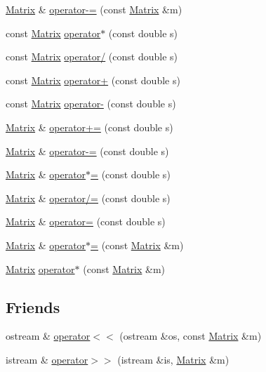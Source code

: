 \begin{DoxyCompactItemize}
\hyperlink{classMatrix}{Matrix} \& \hyperlink{classMatrix_a0e459fd035b2435ea016dc93c55ccac0}{operator-\/=} (const \hyperlink{classMatrix}{Matrix} \&m)
\item 
const \hyperlink{classMatrix}{Matrix} \hyperlink{classMatrix_ac4e94b307c56a15fb47a9255855f94a9}{operator$\ast$} (const double s)
\item 
const \hyperlink{classMatrix}{Matrix} \hyperlink{classMatrix_a2525c0e0feb231dd01fb6ae96aa53dac}{operator/} (const double s)
\item 
const \hyperlink{classMatrix}{Matrix} \hyperlink{classMatrix_a3c70791a9bb45afff8d0ea23601e3203}{operator+} (const double s)
\item 
const \hyperlink{classMatrix}{Matrix} \hyperlink{classMatrix_a254817e151d338279aec5711b6cdf403}{operator-\/} (const double s)
\item 
\hyperlink{classMatrix}{Matrix} \& \hyperlink{classMatrix_a54d2f788e4e209cfe472bbcbbbd6bc2d}{operator+=} (const double s)
\item 
\hyperlink{classMatrix}{Matrix} \& \hyperlink{classMatrix_ad513d4073587eab0cee247875b6c860a}{operator-\/=} (const double s)
\item 
\hyperlink{classMatrix}{Matrix} \& \hyperlink{classMatrix_a8079792abad8b038cd795a339ce9747b}{operator$\ast$=} (const double s)
\item 
\hyperlink{classMatrix}{Matrix} \& \hyperlink{classMatrix_ad1acebe419756785acef046796fb6060}{operator/=} (const double s)
\item 
\hyperlink{classMatrix}{Matrix} \& \hyperlink{classMatrix_a9bea17f8319e2e2064fd85700e46d2fb}{operator=} (const double s)
\item 
\hyperlink{classMatrix}{Matrix} \& \hyperlink{classMatrix_a3226c4b1a3ffb1090a7434806ad2ef03}{operator$\ast$=} (const \hyperlink{classMatrix}{Matrix} \&m)
\item 
\hyperlink{classMatrix}{Matrix} \hyperlink{classMatrix_ae9307b29ba230013f0fce5ebf8e7fecd}{operator$\ast$} (const \hyperlink{classMatrix}{Matrix} \&m)
\end{DoxyCompactItemize}
\subsection*{Friends}
\begin{DoxyCompactItemize}
\item 
ostream \& \hyperlink{classMatrix_a5ed9a90fd6f010e7e9840a17d92d5361}{operator$<$$<$} (ostream \&os, const \hyperlink{classMatrix}{Matrix} \&m)
\item 
istream \& \hyperlink{classMatrix_afcea9fa7d9a5052070fe1fda963ef237}{operator$>$$>$} (istream \&is, \hyperlink{classMatrix}{Matrix} \&m)
\end{DoxyCompactItemize}


